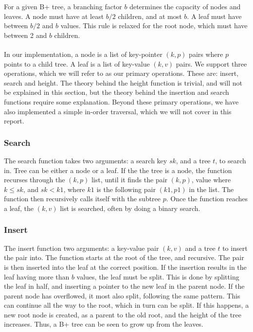 For a given B+ tree, a branching factor $b$ determines the capacity of nodes and leaves. A node must have at least $b/2$ children, and at most $b$. A leaf must have between $b/2$ and $b$ values. This rule is relaxed for the root node, which must have between 2 and $b$ children. 

\paragraph{}
In our implementation, a node is a list of key-pointer $(k, p)$ pairs where $p$ points to a child tree. A leaf is a list of key-value $(k, v)$ pairs. We support three operations, which we will refer to as our primary operations. These are: insert, search and height. The theory behind the height function is trivial, and will not be explained in this section, but the theory behind the insertion and search functions require some explanation. Beyond these primary operations, we have also implemented a simple in-order traversal, which we will not cover in this report.

\subsubsection{Search}
The search function takes two arguments: a search key $sk$, and a tree $t$, to search in. Tree can be either a node or a leaf. If the the tree is a node, the function recurses through the $(k, p)$ list, until it finds the pair $(k, p)$, value where $k \le sk$, and $sk < k1$, where $k1$ is the following pair $(k1, p1)$ in the list. The function then recursively calls itself with the subtree $p$. Once the function reaches a leaf, the $(k, v)$ list is searched, often by doing a binary search.

\subsubsection{Insert}
The insert function two arguments: a key-value pair $(k, v)$ and a tree $t$ to insert the pair into. The function starts at the root of the tree, and recursive. The pair is then inserted into the leaf at the correct position. If the insertion results in the leaf having more than $b$ values, the leaf must be split. This is done by splitting the leaf in half, and inserting a pointer to the new leaf in the parent node. If the parent node has overflowed, it most also split, following the same pattern. This can continue all the way to the root, which in turn can be split. If this happens, a new root node is created, as a parent to the old root, and the height of the tree increases. Thus, a B+ tree can be seen to grow up from the leaves.
